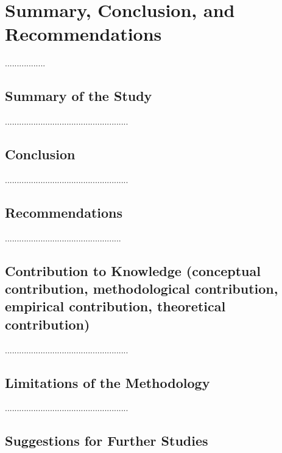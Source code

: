 \section{Summary, Conclusion, and Recommendations} 
.................
\subsection{Summary of the Study}
....................................................
\subsection{Conclusion}
....................................................
\subsection{Recommendations}
.................................................
\subsection{Contribution to Knowledge (conceptual contribution, methodological contribution, empirical
contribution, theoretical contribution)}
....................................................
\subsection{Limitations of the Methodology}
....................................................
\subsection{Suggestions for Further Studies}